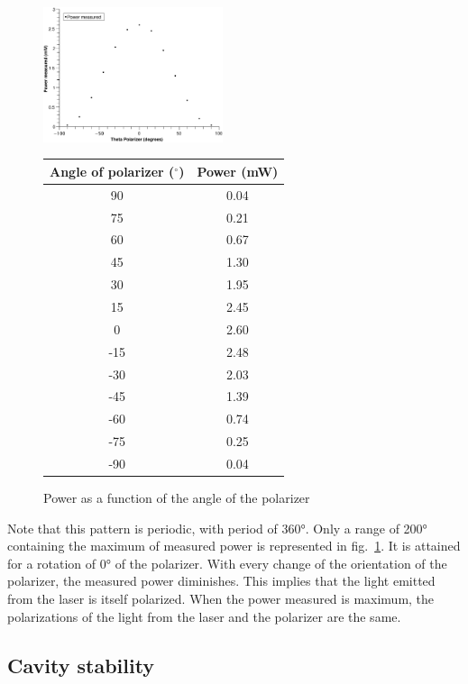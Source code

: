 \documentclass{scrartcl}
\begin{document}
\begin{figure}[!ht]
\centering
\parbox{0.4\textwidth}{
\begin{footnotesize}
    \includegraphics[width=0.47\textwidth]{Polarization.eps}
\end{footnotesize}
}
\qquad
\begin{minipage}[c]{0.53\textwidth}%
\centering
    \begin{tabular}{c|c}
    Angle of polarizer ($^\circ$) &  Power (mW)\\
    \hline
    90 & 0.04 \\
    75 & 0.21 \\
    60 & 0.67 \\
    45 & 1.30 \\
    30 & 1.95 \\
    15 & 2.45 \\
    0 & 2.60 \\
    -15 & 2.48 \\
    -30 & 2.03 \\
    -45 & 1.39  \\
    -60 & 0.74 \\
    -75 & 0.25 \\
    -90 & 0.04
    \end{tabular}
\end{minipage}
\caption{Power as a function of the angle of the polarizer}
\label{fig:polarizer}
\end{figure}
\FloatBarrier

Note that this pattern is periodic, with period of 360°. Only a range of 200° containing the maximum of measured power is represented in fig.~\ref{fig:polarizer}. It is attained for a rotation of 0° of the polarizer. With every change of the orientation of the polarizer, the measured power diminishes. This implies that the light emitted from the laser is itself polarized. When the power measured is maximum, the polarizations of the light from the laser and the polarizer are the same.


\subsection{Cavity stability}
\end{document}
